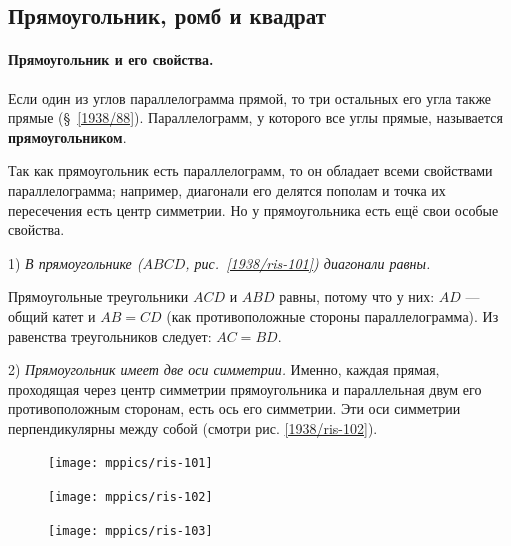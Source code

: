 \documentclass[twoside]{book}
\makeatletter
\newcommand{\rindex}[2][\imki@jobname]{%
  \index[#1]{\detokenize{#2}}%
}
\makeatother
\begin{document}
\subsection*{Прямоугольник, ромб и квадрат}

\paragraph{Прямоугольник и его свойства.}\label{1938/92}
Если один из углов параллелограмма прямой, то три остальных его угла также прямые (§~\ref{1938/88}).
Параллелограмм, у которого все углы прямые, называется \rindex{прямоугольник}\textbf{прямоугольником}.

Так как прямоугольник есть параллелограмм, то он обладает всеми свойствами параллелограмма;
например, диагонали его делятся пополам и точка их пересечения есть центр симметрии.
Но у прямоугольника есть ещё свои особые свойства.

1) \emph{В прямоугольнике \emph{($ABCD$, рис.~\ref{1938/ris-101})} диагонали равны.}

Прямоугольные треугольники $ACD$ и $ABD$ равны, потому что у них:
$AD$ — общий катет и $AB=CD$ (как противоположные стороны параллелограмма).
Из равенства треугольников следует:
$AC = BD$.

2) \emph{Прямоугольник имеет две оси симметрии.}
Именно, каждая прямая, проходящая через центр симметрии прямоугольника и параллельная двум его противоположным сторонам, есть ось его симметрии.
Эти оси симметрии перпендикулярны между собой (смотри рис. \ref{1938/ris-102}).

\begin{figure}[h]
\begin{minipage}{.32\textwidth}
\centering
\texttt{[image: mppics/ris-101]}
\end{minipage}\hfill
\begin{minipage}{.32\textwidth}
\centering
\texttt{[image: mppics/ris-102]}
\end{minipage}\hfill
\begin{minipage}{.32\textwidth}
\centering
\texttt{[image: mppics/ris-103]}
\end{minipage}

\medskip

\begin{minipage}{.32\textwidth}
\centering
\caption{}\label{1938/ris-101}
\end{minipage}\hfill
\begin{minipage}{.32\textwidth}
\centering
\caption{}\label{1938/ris-102}
\end{minipage}\hfill
\begin{minipage}{.32\textwidth}
\centering
\caption{}\label{1938/ris-103}
\end{minipage}
\vskip-4mm
\end{figure} 
\end{document}
